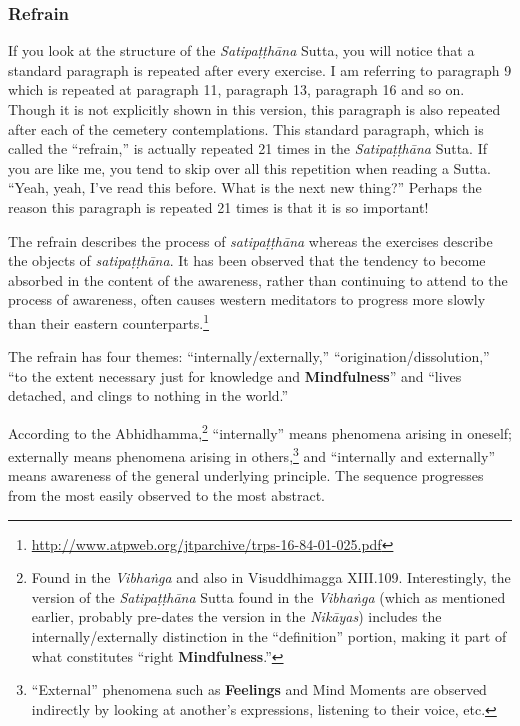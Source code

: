 \pagebreak

\subsubsection*{Refrain}

If you look at the structure of the \textit{Satipaṭṭhāna} Sutta, you will notice that a standard paragraph is repeated after every exercise. I am referring to paragraph 9 which is repeated at paragraph 11, paragraph 13, paragraph 16 and so on. Though it is not explicitly shown in this version, this paragraph is also repeated after each of the cemetery contemplations. This standard paragraph, which is called the “refrain,” is actually repeated 21 times in the \textit{Satipaṭṭhāna} Sutta. If you are like me, you tend to skip over all this repetition when reading a Sutta. “Yeah, yeah, I’ve read this before. What is the next new thing?” Perhaps the reason this paragraph is repeated 21 times is that it is so important!

The refrain describes the process of \textit{satipaṭṭhāna} whereas the exercises describe the objects of \textit{satipaṭṭhāna}. It has been observed that the tendency to become absorbed in the content of the awareness, rather than continuing to attend to the process of awareness, often causes western meditators to progress more slowly than their eastern counterparts.\footnote{\url{http://www.atpweb.org/jtparchive/trps-16-84-01-025.pdf}}

The refrain has four themes: “internally/externally,” “origination/dissolution,” “to the extent necessary just for knowledge and \textbf{Mindfulness}” and “lives detached, and clings to nothing in the world.”

According to the Abhidhamma,\footnote{Found in the \textit{Vibhaṅga} and also in Visuddhimagga XIII.109. Interestingly, the version of the \textit{Satipaṭṭhāna} Sutta found in the \textit{Vibhaṅga} (which as mentioned earlier, probably pre-dates the version in the \textit{Nikāyas}) includes the internally/externally distinction in the “definition” portion, making it part of what constitutes “right \textbf{Mindfulness}.”} “internally” means phenomena arising in oneself; externally means phenomena arising in others,\footnote{“External” phenomena such as \textbf{Feelings} and Mind Moments are observed indirectly by looking at another’s expressions, listening to their voice, etc.} and “internally and externally” means awareness of the general underlying principle. The sequence progresses from the most easily observed to the most abstract.

